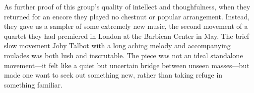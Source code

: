 As further proof of this group’s quality of intellect and thoughfulness, when they returned for an encore they played no chestnut or popular arrangement. Instead, they gave us a sampler of some extremely new music, the second movement of a quartet they had premiered in London at the Barbican Center in May. The brief slow movement Joby Talbot with a long aching melody and accompanying roulades was both lush and inscrutable. The piece was not an ideal standalone movement—it felt like a quiet but uncertain bridge between unseen masses—but made one want to seek out something new, rather than taking refuge in something familiar.
